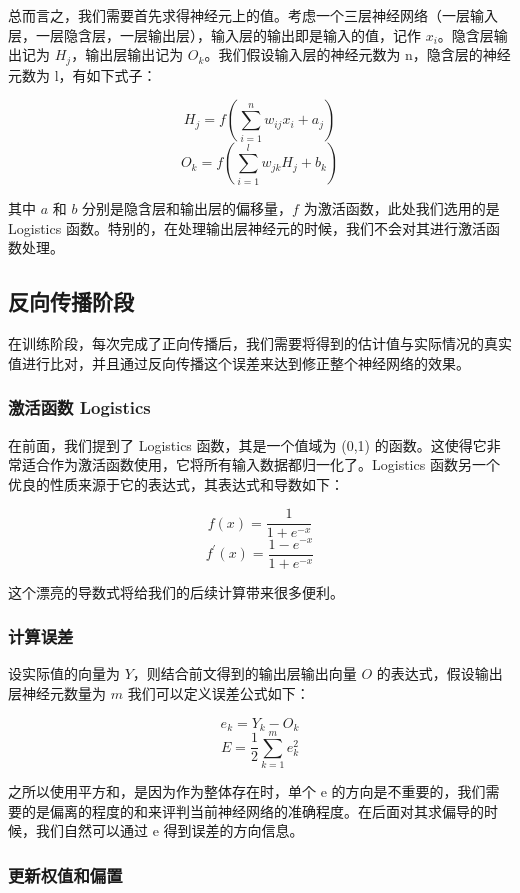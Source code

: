 总而言之，我们需要首先求得神经元上的值。考虑一个三层神经网络（一层输入层，一层隐含层，一层输出层），输入层的输出即是输入的值，记作 $x_i$。隐含层输出记为 $H_j$，输出层输出记为 $O_k$。我们假设输入层的神经元数为 n，隐含层的神经元数为 l，有如下式子：

$$H_j=f(\sum_{i=1}^nw_{ij}x_i+a_j)$$
$$O_k=f(\sum_{i=1}^lw_{jk}H_j+b_k)$$

其中 $a$ 和 $b$ 分别是隐含层和输出层的偏移量，$f$ 为激活函数，此处我们选用的是 Logistics 函数。特别的，在处理输出层神经元的时候，我们不会对其进行激活函数处理。

\subsection{反向传播阶段}

在训练阶段，每次完成了正向传播后，我们需要将得到的估计值与实际情况的真实值进行比对，并且通过反向传播这个误差来达到修正整个神经网络的效果。

\subsubsection{激活函数 Logistics}

在前面，我们提到了 Logistics 函数，其是一个值域为 (0,1) 的函数。这使得它非常适合作为激活函数使用，它将所有输入数据都归一化了。Logistics 函数另一个优良的性质来源于它的表达式，其表达式和导数如下：

$$f(x)=\frac{1}{1+e^{-x}}$$
$$f^{'}(x)=\frac{1-e^{-x}}{1+e^{-x}}$$

这个漂亮的导数式将给我们的后续计算带来很多便利。

\subsubsection{计算误差}

设实际值的向量为 $Y$，则结合前文得到的输出层输出向量 $O$ 的表达式，假设输出层神经元数量为 $m$ 我们可以定义误差公式如下：

$$e_k=Y_k-O_k$$
$$E=\frac12\sum^m_{k=1}e_k^2$$

之所以使用平方和，是因为作为整体存在时，单个 e 的方向是不重要的，我们需要的是偏离的程度的和来评判当前神经网络的准确程度。在后面对其求偏导的时候，我们自然可以通过 e 得到误差的方向信息。

\subsubsection{更新权值和偏置}


